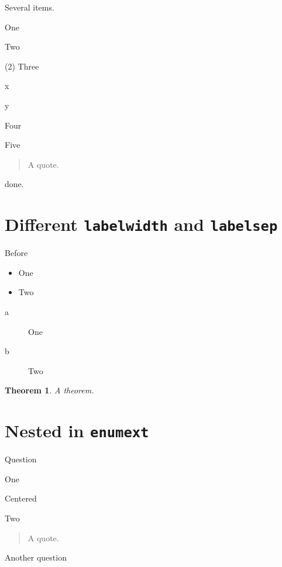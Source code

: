 \documentclass{article}
\newtheorem{thm}{Theorem}
\begin{document}
Several items.

\begin{enumext*}[columns=2,item-break=true,label=\arabic*.]
  \item One
  \item Two
  \item(2) Three \begin{trivlist}\item[X] x \item[Y] y\end{trivlist}
  \item Four
  \item Five \begin{quote}A quote.\end{quote} done.
\end{enumext*}

\section{Different \texttt{labelwidth} and \texttt{labelsep}}

\begin{enumext*}[columns=1,label=\arabic*.,labelwidth=3em,labelsep=1.5em]
  \item Before \begin{itemize}\item One \item Two\end{itemize}
    \begin{description}\item[a] One \item[b] Two\end{description}
    \begin{thm}A theorem.\end{thm}
\end{enumext*}

\section{Nested in \texttt{enumext}}

\begin{enumext}
  \item Question
    \begin{enumext*}[columns=2]
      \item One \begin{center}Centered\end{center}
      \item Two \begin{quote}A quote.\end{quote}
    \end{enumext*}
  \item Another question
\end{enumext}
\end{document}
